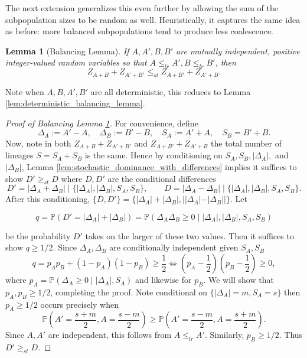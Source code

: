 \documentclass[10pt,oneside,reqno]{article}
\theoremstyle{plain}
\newtheorem{lemma}[theorem]{Lemma}
\theoremstyle{definition}
\numberwithin{equation}{section}
\renewcommand{\leq}{\leqslant}
\renewcommand{\geq}{\geqslant}
\renewcommand{\P}{\mathbb{P}}
\begin{document}
\noindent The next extension generalizes this even further by allowing the sum of the subpopulation sizes to be random as well. Heuristically, it captures the same idea as before: more balanced subpopulations tend to produce less coalescence.

  \begin{lemma}[Balancing Lemma] 
    If $A,A', B, B'$ are mutually independent, positive integer-valued random variables so that $A \leq_{lr} A', B \leq_{lr} B'$, then
    \[Z_{A + B} + Z_{A' + B'} \leq_{st} Z_{A + B'} + Z_{A' + B}. \]
    \label{lem:balancing_lemma}
    \end{lemma}
    \noindent Note when $A,B,A', B'$ are all deterministic, this reduces to Lemma \ref{lem:deterministic_balancing_lemma}. 

    \begin{proof}[Proof of Balancing Lemma \ref{lem:balancing_lemma}]
        For convenience, define
        \[\Delta_A := A' - A, \quad \Delta_B := B' - B, \quad S_A := A' + A, \quad S_B = B' + B.\]
        \noindent Now, note in both $Z_{A + B} + Z_{A' + B'}$ and $Z_{A + B'} + Z_{A' + B}$ the total number of lineages $S = S_A + S_B$ is the same. Hence by conditioning on $S_A,S_B, |\Delta_A|,$ and $|\Delta_B|$, Lemma \ref{lem:stochastic_dominance_with_differences} implies it suffices to show $D' \geq_{st} D$ where $D,D'$ are the conditional differences
        \[D' = |\Delta_A + \Delta_B| \mid \{|\Delta_A|, |\Delta_B| , S_A, S_B \}, \qquad D = |\Delta_A - \Delta_B| \mid \{|\Delta_A|, |\Delta_B| , S_A, S_B \}.\]
        \noindent After this conditioning, $\{D, D'\} = \{|\Delta_A| + |\Delta_B|, ||\Delta_A| - |\Delta_B||\}$. Let
        
        \[q = \P(D' = |\Delta_A| + |\Delta_B|) = \P(\Delta_A\Delta_B \geq 0 \mid |\Delta_A|, |\Delta_B| , S_A, S_B)\]
        
        \noindent be the probability $D'$  takes on the larger of these two values. Then it suffices to show $q \geq 1/2$. Since $\Delta_A, \Delta_B$ are conditionally independent given $S_A, S_B$
        \[q = p_Ap_B + (1-p_A)(1-p_B) \geq \frac{1}{2} \iff \left(p_A - \frac{1}{2} \right) \left(p_B - \frac{1}{2} \right) \geq 0,\]
        \noindent where $p_A = \P(\Delta_A \geq 0 \mid |\Delta_A|, S_A)$ and likewise for $p_B$. We will show that $p_A, p_B \geq 1/2$, completing the proof. Note conditional on $\{|\Delta_A| = m, S_A = s\}$ then $p_A \geq 1/2$ occurs precisely when
        \[\P\left(A'=\frac{s+m}{2}, A = \frac{s-m}{2}\right) \geq \P\left(A'=\frac{s-m}{2}, A = \frac{s+m}{2}\right).\]
        \noindent Since $A,A'$ are independent, this follows from $A \leq_{lr} A'.$ Similarly, $p_B \geq 1/2$. Thus $D' \geq_{st} D$. 
    \end{proof}
\end{document}
